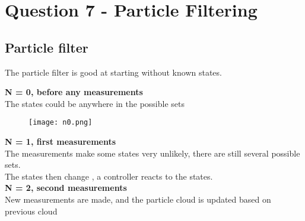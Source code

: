 \chapter{Question 7 - Particle Filtering}

\section{Particle filter} %
\label{sec:particle_filter}
The particle filter is good at starting without known states.

\textbf{N = 0, before any measurements} \\
The states could be anywhere in the possible sets \\
\begin{figure}
        \texttt{[image: n0.png]}
\end{figure}
\textbf{N = 1, first measurements} \\
The measurements make some states very unlikely, there are still several possible sets. \\
The states then change , a controller reacts to the states. \\
\textbf{N = 2, second measurements} \\
New measurements are made, and the particle cloud is updated based on previous cloud \\



